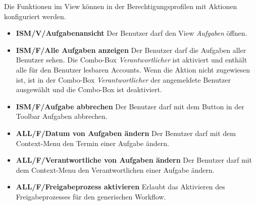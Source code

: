 \documentclass[a4paper,10pt]{book}
\begin{document}
Die Funktionen im View können in der Berechtigungsprofilen mit Aktionen konfiguriert werden.
\begin{itemize}
 \item \textbf{ISM/V/Aufgabenansicht} Der Benutzer darf den View \textit{Aufgaben} öffnen.
 \item \textbf{ISM/F/Alle Aufgaben anzeigen} Der Benutzer darf die Aufgaben aller Benutzer sehen. Die Combo-Box \textit{Verantwortlicher} ist aktiviert und enthält alle für den Benutzer lesbaren Accounts. Wenn die Aktion nicht zugewiesen ist, ist in der Combo-Box \textit{Verantwortlicher} der angemeldete Benutzer ausgewählt und die Combo-Box ist deaktiviert.
 \item \textbf{ISM/F/Aufgabe abbrechen} Der Benutzer darf mit dem Button in der Toolbar Aufgaben abbrechen.
 \item \textbf{ALL/F/Datum von Aufgaben ändern} Der Benutzer darf mit dem Context-Menu den Termin einer Aufgabe ändern.
 \item \textbf{ALL/F/Verantwortliche von Aufgaben ändern} Der Benutzer darf mit dem Context-Menu den Verantwortlichen einer Aufgabe ändern.
 \item \textbf{ALL/F/Freigabeprozess akti\-vie\-ren} Erlaubt das
   Aktivieren des Freigabeprozesses für den generischen Workflow.
\end{itemize}
\end{document}
